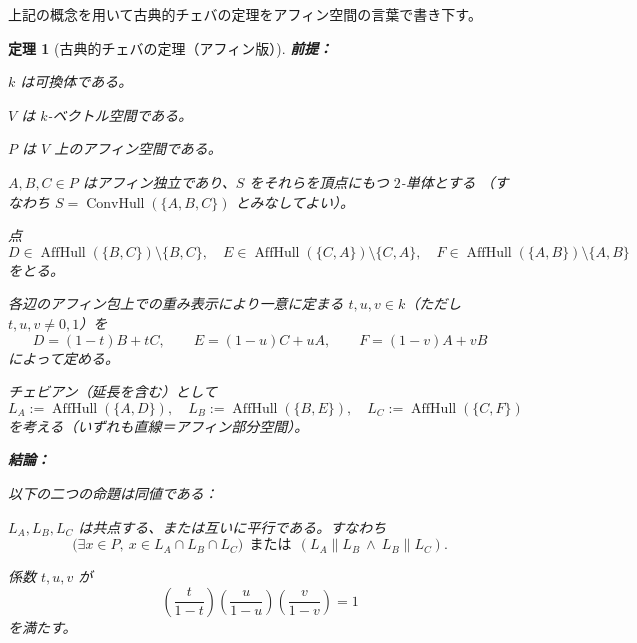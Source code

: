 \documentclass[a4paper,12pt]{bxjsbook}
\newlength{\customindent}
\newenvironment{body}{
  \par
  \begingroup
  \setlength{\leftskip}{\customindent}
  \setlength{\rightskip}{0pt}
  \setlength{\parindent}{1em}
  \setlength{\displayindent}{\customindent}
  \setlength{\displaywidth}{\dimexpr\linewidth-\customindent\relax}
}{
  \par
  \endgroup
}
\theoremstyle{theorem}
\newtheorem{theorem}{定理}[chapter]
\DeclareMathOperator{\AffHull}{AffHull}
\DeclareMathOperator{\ConvHull}{ConvHull}
\begin{document}
    \begin{body}
        \indent 上記の概念を用いて古典的チェバの定理をアフィン空間の言葉で書き下す。
    \end{body}

    \begin{theorem}[古典的チェバの定理（アフィン版）]

        \noindent\textbf{前提：}\par
        \begin{theoremenumerate}[label=(A\arabic*), leftmargin=4em, topsep=2pt, partopsep=0pt, itemsep=0pt, parsep=0pt]
            \item $k$ は可換体である。
            \item $V$ は $k$-ベクトル空間である。
            \item $P$ は $V$ 上のアフィン空間である。
            \item $A,B,C\in P$ はアフィン独立であり、$S$ をそれらを頂点にもつ $2$-単体とする
            （すなわち $S=\ConvHull(\{A,B,C\})$ とみなしてよい）。
            \item
            点
            \[
            D\in \AffHull(\{B,C\})\setminus\{B,C\},\quad
            E\in \AffHull(\{C,A\})\setminus\{C,A\},\quad
            F\in \AffHull(\{A,B\})\setminus\{A,B\}
            \]
            をとる。
            \item
            各辺のアフィン包上での重み表示により一意に定まる $t,u,v\in k$（ただし $t,u,v\neq 0,1$）を
            \[
            D=(1-t)B+tC,\qquad
            E=(1-u)C+uA,\qquad
            F=(1-v)A+vB
            \]
            によって定める。
            \item
            チェビアン（延長を含む）として
            \[
            L_A:=\AffHull(\{A,D\}),\quad
            L_B:=\AffHull(\{B,E\}),\quad
            L_C:=\AffHull(\{C,F\})
            \]
            を考える（いずれも直線＝アフィン部分空間）。
        \end{theoremenumerate}
          
        \noindent\textbf{結論：}\par
        以下の二つの命題は同値である：
        \begin{theoremenumerate}[label=(\roman*), leftmargin=4em, topsep=2pt, partopsep=0pt, itemsep=0pt, parsep=0pt]
            \item
            $L_A,L_B,L_C$ は共点する、または互いに平行である。すなわち
            \[
            \bigl(\exists x\in P,\ x\in L_A\cap L_B\cap L_C\bigr)
            \ \ \text{または}\ \
            (L_A\parallel L_B\ \wedge\ L_B\parallel L_C).
            \]
            \item
            係数 $t,u,v$ が
            \[
            \left(\frac{t}{1-t}\right)\left(\frac{u}{1-u}\right)\left(\frac{v}{1-v}\right)=1
            \]
            を満たす。
        \end{theoremenumerate}
      
    \end{theorem}
\end{document}
